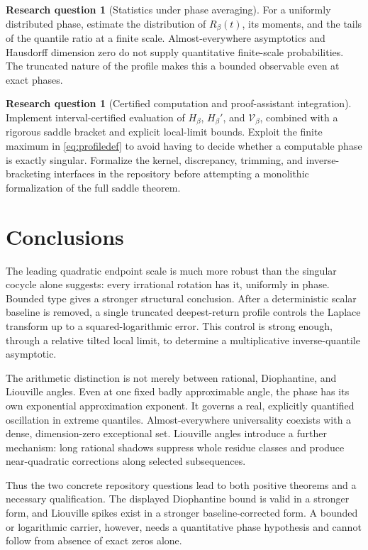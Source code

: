 \documentclass[11pt,a4paper]{article}
\theoremstyle{definition}
\newtheorem{problem}[theorem]{Research question}
\theoremstyle{remark}\newtheorem{remark}[theorem]{Remark}
\newcommand{\VV}{\mathcal V}
\begin{document}
\begin{problem}[Statistics under phase averaging]
For a uniformly distributed phase, estimate the distribution of
$R_\beta(t)$, its moments, and the tails of the quantile ratio at a finite
scale.  Almost-everywhere asymptotics and Hausdorff dimension zero do not
supply quantitative finite-scale probabilities.  The truncated nature of the
profile makes this a bounded observable even at exact phases.
\end{problem}

\begin{problem}[Certified computation and proof-assistant integration]
Implement interval-certified evaluation of $H_\beta$, $H_\beta'$, and
$\VV_\beta$, combined with a rigorous saddle bracket and explicit local-limit
bounds.  Exploit the finite maximum in \eqref{eq:profiledef} to avoid having
to decide whether a computable phase is exactly singular.  Formalize the
kernel, discrepancy, trimming, and inverse-bracketing interfaces in the
repository before attempting a monolithic formalization of the full saddle
theorem.
\end{problem}

\section{Conclusions}

The leading quadratic endpoint scale is much more robust than the singular
cocycle alone suggests: every irrational rotation has it, uniformly in phase.
Bounded type gives a stronger structural conclusion.  After a deterministic
scalar baseline is removed, a single truncated deepest-return profile controls
the Laplace transform up to a squared-logarithmic error.  This control is
strong enough, through a relative tilted local limit, to determine a
multiplicative inverse-quantile asymptotic.

The arithmetic distinction is not merely between rational, Diophantine, and
Liouville angles.  Even at one fixed badly approximable angle, the phase has
its own exponential approximation exponent.  It governs a real, explicitly
quantified oscillation in extreme quantiles.  Almost-everywhere universality
coexists with a dense, dimension-zero exceptional set.  Liouville angles
introduce a further mechanism: long rational shadows suppress whole residue
classes and produce near-quadratic corrections along selected subsequences.

Thus the two concrete repository questions lead to both positive theorems and
a necessary qualification.  The displayed Diophantine bound is valid in a
stronger form, and Liouville spikes exist in a stronger baseline-corrected
form.  A bounded or logarithmic carrier, however, needs a quantitative phase
hypothesis and cannot follow from absence of exact zeros alone.
\end{document}

